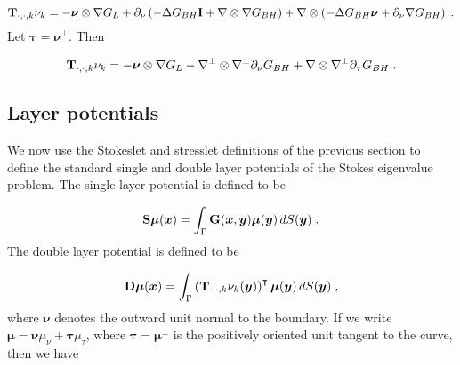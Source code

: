 \documentclass[preprint,12pt]{article}
\def\xx{{\boldsymbol x}}
\def\yy{{\boldsymbol y}}
\def\GG{{\bf G}}
\def\II{{\bf I}}
\def\TT{{\bf T}}
\def\SS{{\bf S}}
\def\DD{{\bf D}}
\def\bmu{{\boldsymbol \mu}}
\def\bnu{{\boldsymbol \nu}}
\def\btau{{\boldsymbol \tau}}
\begin{document}
\begin{equation}
  \TT_{\cdot,\cdot,k} \nu_k = -\bnu \otimes \nabla G_L
  + \partial_\nu \left ( -\Delta G_{BH} \II
  + \nabla \otimes \nabla G_{BH} \right)
  + \nabla \otimes \left ( -\Delta G_{BH} \bnu
  + \partial_{\nu} \nabla G_{BH} \right) \; .
\end{equation}
Let $\btau = \bnu^\bot$. Then

\begin{equation}
  \TT_{\cdot,\cdot,k} \nu_k = -\bnu \otimes \nabla G_L
  - \nabla^\bot \otimes \nabla^\bot \partial_\nu G_{BH}
  +\nabla \otimes \nabla^\bot \partial_\tau G_{BH} \; .
\end{equation}

\subsection{Layer potentials}

We now use the Stokeslet and stresslet definitions
of the previous section to define the standard single
and double layer potentials of the Stokes eigenvalue
problem. The single layer potential is defined to
be

\begin{equation}
  \SS \bmu (\xx) = \int_\Gamma \GG (\xx,\yy) \bmu(\yy)
  \, dS(\yy) \; .
\end{equation}
The double layer potential is defined to be

\begin{equation}
  \DD \bmu (\xx) = \int_\Gamma \left ( \TT_{\cdot,\cdot,k}\nu_k(\yy)
  \right )^\intercal \bmu(\yy) \, dS(\yy) \; ,
\end{equation}
where $\bnu$ denotes the outward unit normal to the boundary.
If we write $\bmu = \bnu \mu_\nu + \btau \mu_\tau$,
where $\btau = \bmu^\bot$ is the positively oriented unit
tangent to the curve, then we have
\end{document}
